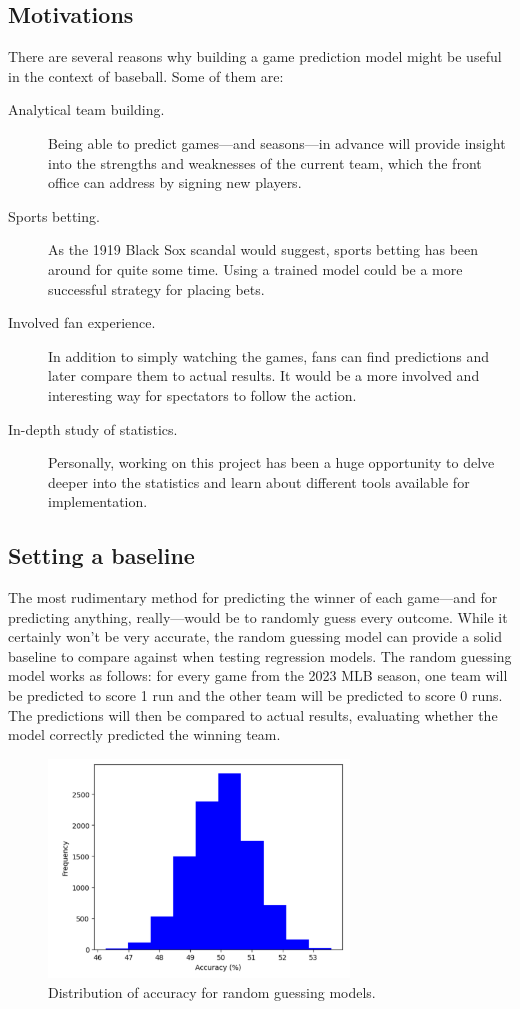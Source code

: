 \documentclass{paper}
\begin{document}
\subsection{Motivations}
There are several reasons why building a game prediction model might be useful in the context of baseball. Some of them are:

\begin{description}
\item[Analytical team building.] Being able to predict games---and seasons---in advance will provide insight into the strengths and weaknesses of the current team, which the front office can address by signing new players.
\item[Sports betting.] As the 1919 Black Sox scandal would suggest, sports betting has been around for quite some time. Using a trained model could be a more successful strategy for placing bets.
\item[Involved fan experience.] In addition to simply watching the games, fans can find predictions and later compare them to actual results. It would be a more involved and interesting way for spectators to follow the action.
\item[In-depth study of statistics.] Personally, working on this project has been a huge opportunity to delve deeper into the statistics and learn about different tools available for implementation.
\end{description}

\subsection{Setting a baseline}
The most rudimentary method for predicting the winner of each game---and for predicting anything, really---would be to randomly guess every outcome. While it certainly won't be very accurate, the random guessing model can provide a solid baseline to compare against when testing regression models. The random guessing model works as follows: for every game from the 2023 MLB season, one team will be predicted to score 1 run and the other team will be predicted to score 0 runs. The predictions will then be compared to actual results, evaluating whether the model correctly predicted the winning team.

\begin{figure}[H]
  \centering
  \includegraphics[width=8cm]{fig1}
  \caption{Distribution of accuracy for random guessing models.}
\end{figure}
\end{document}

